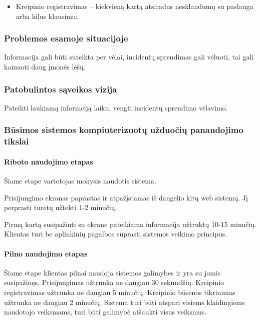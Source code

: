 		\begin{itemize}
			\item Kreipinio registravimas – kiekvieną kartą atsiradus nesklandumų su paslauga arba kilus klausimui
		\end{itemize}
		
		\subsubsection{Problemos esamoje situacijoje}
		
		Informacija gali būti suteikta per vėlai, incidentų sprendimas gali vėluoti, tai gali kainuoti daug įmonės lėšų.
		
		\subsubsection{Patobulintos sąveikos vizija}
		
		Pateikti laukiamą informciją laiku, vengti incidentų sprendimo vėlavimo.
		
		\subsubsection{Būsimos sistemos kompiuterizuotų užduočių panaudojimo tikslai}
		
			\setcounter{tocdepth}{5} \setcounter{secnumdepth}{5}
			
			\paragraph{Riboto naudojimo etapas}
			
			Šiame etape vartotojas mokysis naudotis sistema.
			
			Prisijungimo ekranas paprastas ir atpažįstamas iš daugelio kitų web sistemų.
			Jį perprasti turėtų užtekti 1-2 minučių.

			Pirmą kartą susipažinti su ekrane pateikiama informacija užtruktų 10-15 minučių.
			Klientas turi be aplinkinių pagalbos suprasti sistemos veikimo principus.
			
			\setcounter{tocdepth}{5} \setcounter{secnumdepth}{5}
			
			\paragraph{Pilno naudojimo etapas}
			
			Šiame etape klientas pilnai naudoja sistemos galimybes ir yra su jomis susipažinęs.
			Prisijungimas užtrunka ne daugiau 30 sekundžių. Kreipinio registravimas užtrunka ne daugiau 5 minučių.
			Kreipinio būsenos tikrinimas užtrunka ne daugiau 2 minučių.
			Sistema turi būti atspari visiems klaidingiems naudotojo veiksmams, turi būti galimybė atšaukti visus veiksmus.
			
